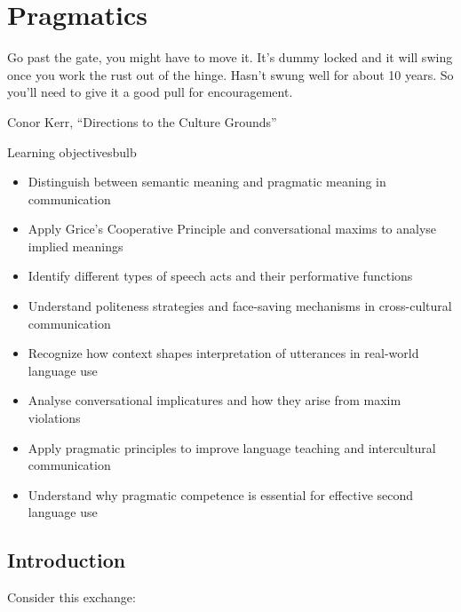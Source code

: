 \chapter{Pragmatics} \label{ch:pragmatics}

\epigraph{Go past the gate, you might have to move it. It's dummy locked and it will swing once you work the rust out of the hinge. Hasn't swung well for about 10 years. So you'll need to give it a good pull for encouragement.}{Conor Kerr, \enquote{Directions to the Culture Grounds}}

\begin{tblsframedsymbol}{Learning objectives}{bulb}
\begin{itemize}[noitemsep, leftmargin=*]
    \item Distinguish between semantic meaning and pragmatic meaning in communication
    \item Apply Grice's Cooperative Principle and conversational maxims to analyse implied meanings
    \item Identify different types of speech acts and their performative functions
    \item Understand politeness strategies and face-saving mechanisms in cross-cultural communication
    \item Recognize how context shapes interpretation of utterances in real-world language use
    \item Analyse conversational implicatures and how they arise from maxim violations
    \item Apply pragmatic principles to improve language teaching and intercultural communication
    \item Understand why pragmatic competence is essential for effective second language use
\end{itemize}
\end{tblsframedsymbol}



\section{Introduction}

Consider this exchange:

\begin{dialogue}
\item[A] 
\item[B] 
\end{dialogue}

